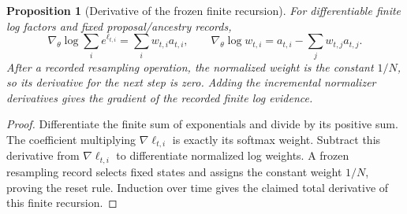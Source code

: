 \documentclass[11pt]{article}
\newtheorem{proposition}{Proposition}
\begin{document}
\begin{proposition}[Derivative of the frozen finite recursion]
\label{prop:exec-frozen-score}
For differentiable finite log factors and fixed proposal/ancestry records,
\begin{equation}
 \nabla_\theta\log\sum_i e^{\ell_{t,i}}
   =\sum_i w_{t,i}a_{t,i},\qquad
 \nabla_\theta\log w_{t,i}
   =a_{t,i}-\sum_jw_{t,j}a_{t,j}.
 \label{eq:exec-frozen-recursion}
\end{equation}
After a recorded resampling operation, the normalized weight is the constant
$1/N$, so its derivative for the next step is zero. Adding the incremental
normalizer derivatives gives the gradient of the recorded finite log evidence.
\end{proposition}
\begin{proof}
Differentiate the finite sum of exponentials and divide by its positive sum.
The coefficient multiplying $\nabla\ell_{t,i}$ is exactly its softmax weight.
Subtract this derivative from $\nabla\ell_{t,i}$ to differentiate normalized
log weights. A frozen resampling record selects fixed states and assigns the
constant weight $1/N$, proving the reset rule. Induction over time gives the
claimed total derivative of this finite recursion.
\end{proof}
\end{document}
